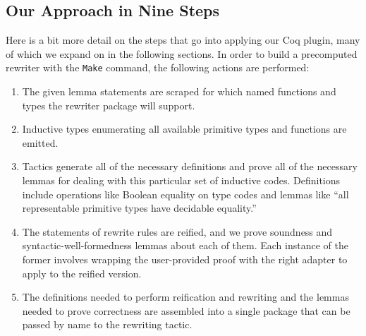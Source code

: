 \subsection{Our Approach in Nine Steps} \label{sec:nine-steps}

Here is a bit more detail on the steps that go into applying our Coq plugin, many of which we expand on in the following sections.
In order to build a precomputed rewriter with the \texttt{Make} command, the following actions are performed:
\begin{enumerate}
\item
  The given lemma statements are scraped for which named functions and types the rewriter package will support.
\item
  Inductive types enumerating all available primitive types and functions are emitted.
\item
  Tactics generate all of the necessary definitions and prove all of the necessary lemmas for dealing with this particular set of inductive codes.
  Definitions include operations like Boolean equality on type codes and lemmas like ``all representable primitive types have decidable equality.''
\item
  The statements of rewrite rules are reified, and we prove soundness and syntactic-well-formedness lemmas about each of them.
  Each instance of the former involves wrapping the user-provided proof with the right adapter to apply to the reified version.
\item
  The definitions needed to perform reification and rewriting and the lemmas needed to prove correctness are assembled into a single package that can be passed by name to the rewriting tactic.
\end{enumerate}

